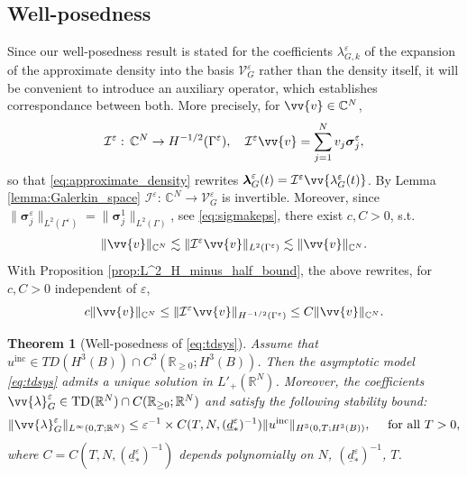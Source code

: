 \documentclass[]{article}
\newtheorem{theorem}{Theorem}
\numberwithin{equation}{section}
\numberwithin{theorem}{section}
\numberwithin{lemma}{section}
\numberwithin{corollary}{section}
\numberwithin{proposition}{section}
\numberwithin{definition}{section}
\newcommand{\re}{\varepsilon}
\renewcommand{\vec}{\boldsymbol}
\begin{document}
	\subsection{Well-posedness}
	Since our well-posedness result is stated for the coefficients  $\lambda_{G,k}^{\re}$ of the expansion of the approximate density into the basis $\mathcal{V}^{\re}_G$ rather than the density itself, it will be convenient to introduce an auxiliary operator, which establishes correspondance between both. More precisely, for $\vv{v}\in \mathbb{C}^N$,   
	\begin{align}
		\label{eq:defIe}
		\mathcal{I}^{\re}: \, \mathbb{C}^N\rightarrow H^{-1/2}(\Gamma^{\re}), \quad \mathcal{I}^{\re}\vv{v}=\sum\limits_{j=1}^Nv_j\vec{\sigma}_j^{\re},
	\end{align}
	so that \eqref{eq:approximate_density} rewrites  $\vec{\lambda}^{\re}_G(t)=\mathcal{I}^{\re}\vv{\lambda^{\re}_{G}(t)}$. By Lemma \ref{lemma:Galerkin_space} $\mathcal{I}^{\re}: \,\mathbb{C}^N\rightarrow \mathcal{V}^{\re}_G$ is invertible. Moreover, since $ \|\vec{\sigma}^{\re}_j\|_{L^2(\Gamma^{\re})} = \|\vec{\sigma}^1_j\|_{L^2(\Gamma)}$, see \eqref{eq:sigmakeps}, there exist $c, C>0$, s.t.
	\begin{align}
		\label{eq:vecV0}
		\|\vv{v}\|_{\mathbb{C}^N} \lesssim	\|\mathcal{I}^{\re}\vv{v}\|_{L^2(\Gamma^{\re})} \lesssim  \|\vv{v}\|_{\mathbb{C}^N}.
	\end{align} 
	With Proposition \ref{prop:L^2_H_minus_half_bound}, the above rewrites, for $c, C>0$ independent of $\re$,
	\begin{align}
		\label{eq:vecV2}
		c\|\vv{v}\|_{\mathbb{C}^N} \leq	\|\mathcal{I}^{\re}\vv{v}\|_{H^{-1/2}(\Gamma^{\re})} \leq C\|\vv{v}\|_{\mathbb{C}^N}.
	\end{align}
	\begin{theorem}[Well-posedness of \eqref{eq:tdsys}]
		\label{theorem:well_posedness}
		Assume that $u^{\operatorname{inc}} \in TD(H^3(B))\cap C^{3}(\mathbb{R}_{\geq 0};H^3(B))$. Then the asymptotic model \eqref{eq:tdsys} admits a unique solution in $L'_+(\mathbb{R}^N)$. Moreover, the coefficients $\vv{\lambda}^{\re}_G\in \operatorname{TD}(\mathbb{R}^N)\cap C(\mathbb{R}_{\geq 0};\mathbb{R}^N)$ and satisfy the following stability bound:
		\begin{align*}%
			\|\vv{\lambda}^{\re}_G \|_{L^{\infty}(0,T;\mathbb{R}^N)} \leq \re^{-1} \times C(T, N, (\underline{d}^{\re}_{*})^{-1})\| u^{\operatorname{inc}} \|_{H^3(0,T; H^3(B))},\quad \text{ for all }T>0,
		\end{align*}
		where $C=C(T, N, (\underline{d}^{\re}_{*})^{-1})$ depends  polynomially on $N$, $(\underline{d}^{\re}_{*})^{-1}$, $T$.
	\end{theorem}
	
\end{document}
